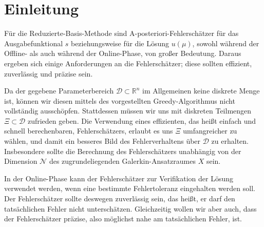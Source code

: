 
\section{Einleitung} %
\label{sec:einleitung}

Für die Reduzierte-Basis-Methode sind A-posteriori-Fehlerschätzer für das Ausgabefunktional $s$ beziehungsweise für die Lösung $u(\mu)$, sowohl während der Offline- als auch während der Online-Phase, von großer Bedeutung.
Daraus ergeben sich einige Anforderungen an die Fehlerschätzer; diese sollten effizient, zuverlässig und präzise sein.

Da der gegebene Parameterbereich $\mathcal D \subset \mathbb{R}^n$ im Allgemeinen keine diskrete Menge ist, können wir diesen mittels des vorgestellten Greedy-Algorithmus nicht vollständig ausschöpfen.
Stattdessen müssen wir uns mit diskreten Teilmengen $\Xi \subset \mathcal D$ zufrieden geben.
Die Verwendung eines effizienten, das heißt einfach und schnell berechenbaren, Fehlerschätzers, erlaubt es uns $\Xi$ umfangreicher zu wählen, und damit ein besseres Bild des Fehlerverhaltens über $\mathcal D$ zu erhalten.
Insbesondere sollte die Berechnung des Fehlerschätzers unabhängig von der Dimension $\mathcal N$ des zugrundeliegenden Galerkin-Ansatzraumes $X$ sein.

In der Online-Phase kann der Fehlerschätzer zur Verifikation der Lösung verwendet werden, wenn eine bestimmte Fehlertoleranz eingehalten werden soll.
Der Fehlerschätzer sollte deswegen zuverlässig sein, das heißt, er darf den tatsächlichen Fehler nicht unterschätzen.
Gleichzeitig wollen wir aber auch, dass der Fehlerschätzer präzise, also möglichst nahe am tatsächlichen Fehler, ist.

